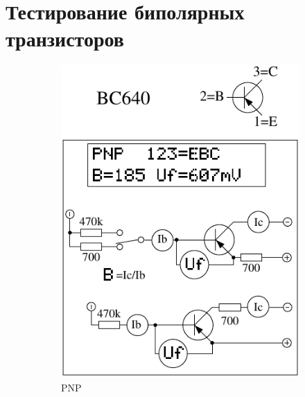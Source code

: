 \chapter{Тестирование биполярных транзисторов}
\label{sec:BJTmeasurements}

\begin{figure}[H]
  \begin{subfigure}[b]{.5\textwidth}
    \centering
    \includegraphics[width=1.\textwidth]{../FIG/BJT_BC640.pdf}
    \caption{PNP}
    \label{fig:BJT-PNP}
  \end{subfigure}
  ~
  \begin{subfigure}[b]{.5\textwidth}
    \centering

\end{subfigure}
\end{figure}
